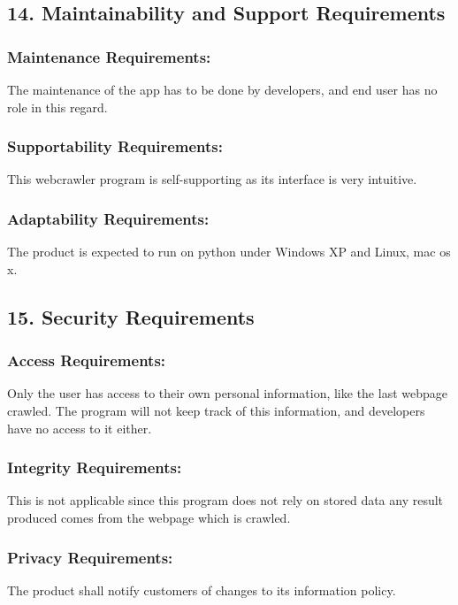 \documentclass[titlepage]{article}
\begin{document}
\subsection{14. Maintainability and Support Requirements }

\subsubsection*{Maintenance Requirements:}
 The maintenance of the app has to be done by developers, and end user has no role in this regard.

\subsubsection*{Supportability Requirements:}

This webcrawler program is self-supporting as its interface is very intuitive.

\subsubsection*{Adaptability Requirements:}

The product is expected to run on python under Windows XP and Linux, mac os x. 

\subsection{15. Security Requirements }

\subsubsection*{Access Requirements:}
Only the user has access to their own personal information, like the last webpage crawled. The program will not keep track of this information, and developers have no access to it either.

\subsubsection*{Integrity Requirements:}
This is not applicable since this program does not rely on stored data any result produced comes from the webpage which is crawled. 

\subsubsection*{Privacy Requirements:}
The product shall notify customers of changes to its information policy.
\end{document}
